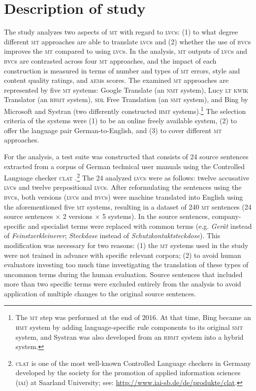 \documentclass[output=paper]{langsci/langscibook}
\begin{document}
\section{Description of study}\label{marzouk:desofst}


The study analyzes two aspects of \textsc{mt} with regard to \textsc{lvc}s: (1) to what degree different \textsc{mt} approaches are able to translate \textsc{lvc}s and (2) whether the use of \textsc{bvc}s improves the \textsc{mt} compared to using \textsc{lvc}s. In the analysis, \textsc{mt} outputs of \textsc{lvc}s and \textsc{bvc}s are contrasted across four \textsc{mt} approaches, and the impact of each construction is measured in terms of number and types of \textsc{mt} errors, style and content quality ratings, and \textsc{aem}s scores. The examined \textsc{mt} approaches are represented by five \textsc{mt} systems: Google Translate (an \textsc{nmt} system), Lucy \textsc{lt} \textsc{kwik} Translator (an \textsc{rbmt} system), \textsc{sdl} Free Translation (an \textsc{smt} system), and Bing by Microsoft and Systran (two differently constructed \textsc{hmt} systems).\footnote{The \textsc{mt} step was performed at the end of $2016$. At that time, Bing became an \textsc{hmt} system by adding language-specific rule components to its original \textsc{smt} system, and Systran was also developed from an \textsc{rbmt} system into a hybrid system.} The selection criteria of the systems were (1) to be an online freely available system, (2) to offer the language pair German-to-English, and (3) to cover different \textsc{mt} approaches.

For the analysis, a test suite was constructed that consists of 24 source sentences extracted from a corpus of German technical user manuals using the Controlled Language checker \textsc{clat} \citep{Rosener2010}.\footnote{ \textsc{clat} is one of the most well-known Controlled Language checkers in Germany developed by the society for the promotion of applied information sciences (\textsc{iai}) at Saarland University; see: \url{http://www.iai-sb.de/de/produkte/clat}.} The 24 analyzed \textsc{lvc}s were as follows: twelve accusative \textsc{lvc}s and twelve prepositional \textsc{lvc}s. After reformulating the sentences using the \textsc{bvc}s, both versions (\textsc{lvc}s and \textsc{bvc}s) were machine translated into English using the aforementioned five \textsc{mt} systems, resulting in a dataset of 240 \textsc{mt} sentences (24 source sentences $\times$ 2 versions $\times$ 5 systems). In the source sentences, company-specific and specialist terms were replaced with common terms (e.g. \textit{Gerät} instead of \textit{Feinstzerkleinerer}; \textit{Steckdose} instead of \textit{Schutzkontaktsteckdose}). This modification was necessary for two reasons: (1) the \textsc{mt} systems used in the study were not trained in advance with specific relevant corpora; (2) to avoid human evaluators investing too much time investigating the translation of these types of uncommon terms during the human evaluation. Source sentences that included more than two specific terms were excluded entirely from the analysis to avoid application of multiple changes to the original source sentences.
\end{document}
